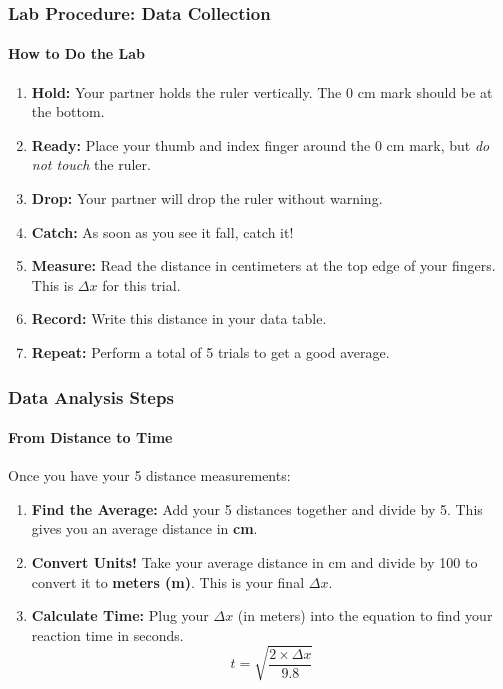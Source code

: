 \documentclass{beamer}
\begin{document}
\begin{frame}
\frametitle{Lab Procedure: Data Collection}
\framesubtitle{How to Do the Lab}
    \begin{enumerate}
        \item \textbf{Hold:} Your partner holds the ruler vertically. The 0 cm mark should be at the bottom.
        \item \textbf{Ready:} Place your thumb and index finger around the 0 cm mark, but \textit{do not touch} the ruler.
        \item \textbf{Drop:} Your partner will drop the ruler without warning.
        \item \textbf{Catch:} As soon as you see it fall, catch it!
        \item \textbf{Measure:} Read the distance in centimeters at the top edge of your fingers. This is $\Delta x$ for this trial.
        \item \textbf{Record:} Write this distance in your data table.
        \item \textbf{Repeat:} Perform a total of 5 trials to get a good average.
    \end{enumerate}
\end{frame}

\begin{frame}
\frametitle{Data Analysis Steps}
\framesubtitle{From Distance to Time}
    Once you have your 5 distance measurements:
    
    \begin{enumerate}
        \item \textbf{Find the Average:} Add your 5 distances together and divide by 5. This gives you an average distance in \textbf{cm}. \pause
        
        \item \alert{\textbf{Convert Units!}} Take your average distance in cm and divide by 100 to convert it to \textbf{meters (m)}. This is your final $\Delta x$. \pause
        
        \item \textbf{Calculate Time:} Plug your $\Delta x$ (in meters) into the equation to find your reaction time in seconds.
            \[ t = \sqrt{\frac{2 \times \Delta x}{9.8}} \]
    \end{enumerate}
\end{frame}
\end{document}
